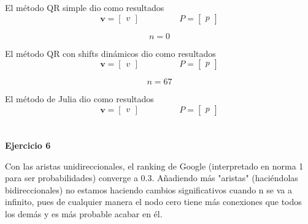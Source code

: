 \documentclass[11pt]{article}
\begin{document}
El método QR simple dio como resultados
\[
 \textbf{v} =
 \begin{bmatrix}
v
\end{bmatrix}
 \qquad\text{ }\qquad
P =
 \begin{bmatrix}
p
\end{bmatrix}
 \]

 $$n = 0$$

El método QR con shifts dinámicos dio como resultados
\[
 \textbf{v} =
 \begin{bmatrix}
v
\end{bmatrix}
 \qquad\text{ }\qquad
P =
 \begin{bmatrix}
p
\end{bmatrix}
 \]

 $$n = 67$$

El método de Julia dio como resultados
\[
 \textbf{v} =
 \begin{bmatrix}
v
\end{bmatrix}
 \qquad\text{ }\qquad
P =
 \begin{bmatrix}
p
\end{bmatrix}
 \]
\\
\\

\noindent
\textbf{Ejercicio 6}

\noindent
Con las aristas unidireccionales, el ranking de Google (interpretado en norma
1 para ser probabilidades) converge a 0.3.
Añadiendo más "aristas" (haciéndolas bidireccionales) no estamos haciendo
cambios significativos cuando n se va a infinito, pues de cualquier manera
el nodo cero tiene más conexiones que todos los demás y es más probable
acabar en él.

\noindent
\end{document}
